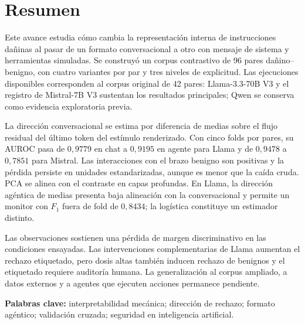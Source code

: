 \chapter*{Resumen}

Este avance estudia cómo cambia la representación interna de instrucciones dañinas al pasar de un formato conversacional a otro con mensaje de sistema y herramientas simuladas. Se construyó un corpus contrastivo de 96 pares dañino--benigno, con cuatro variantes por par y tres niveles de explicitud. Las ejecuciones disponibles corresponden al corpus original de 42 pares: Llama-3.3-70B V3 y el registro de Mistral-7B V3 sustentan los resultados principales; Qwen se conserva como evidencia exploratoria previa.

La dirección conversacional se estima por diferencia de medias sobre el flujo residual del último token del estímulo renderizado. Con cinco folds por pares, su AUROC pasa de $0{,}9779$ en chat a $0{,}9195$ en agente para Llama y de $0{,}9478$ a $0{,}7851$ para Mistral. Las interacciones con el brazo benigno son positivas y la pérdida persiste en unidades estandarizadas, aunque es menor que la caída cruda. PCA se alinea con el contraste en capas profundas. En Llama, la dirección agéntica de medias presenta baja alineación con la conversacional y permite un monitor con $F_1$ fuera de fold de $0{,}8434$; la logística constituye un estimador distinto.

Las observaciones sostienen una pérdida de margen discriminativo en las condiciones ensayadas. Las intervenciones complementarias de Llama aumentan el rechazo etiquetado, pero dosis altas también inducen rechazo de benignos y el etiquetado requiere auditoría humana. La generalización al corpus ampliado, a datos externos y a agentes que ejecuten acciones permanece pendiente.

\vspace{0.4cm}\noindent
\textbf{Palabras clave:} interpretabilidad mecánica; dirección de rechazo; formato agéntico; validación cruzada; seguridad en inteligencia artificial.
